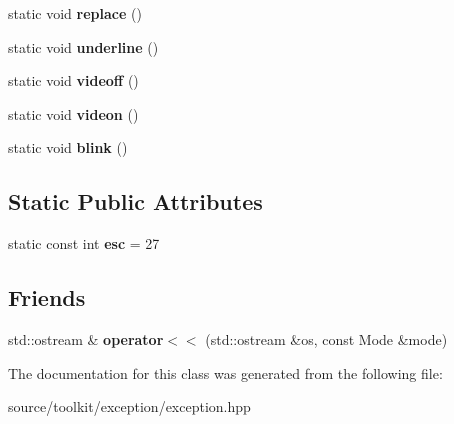 \begin{DoxyCompactItemize}
static void {\bfseries replace} ()
\item 
\mbox{\label{classConsole_acdbffad9e6d5faf3654f2f662a885c05}} 
static void {\bfseries underline} ()
\item 
\mbox{\label{classConsole_a0c0b82ca8465e8d07d1c1000fd1c7065}} 
static void {\bfseries videoff} ()
\item 
\mbox{\label{classConsole_a9452e745b8255bfc5c01914e284a6dde}} 
static void {\bfseries videon} ()
\item 
\mbox{\label{classConsole_a0d4128ee5041ea69f58cbb0d200a2f80}} 
static void {\bfseries blink} ()
\end{DoxyCompactItemize}
\subsection*{Static Public Attributes}
\begin{DoxyCompactItemize}
\item 
\mbox{\label{classConsole_abf80bf3470dade29c45fed14ee6e9d38}} 
static const int {\bfseries esc} = 27
\end{DoxyCompactItemize}
\subsection*{Friends}
\begin{DoxyCompactItemize}
\item 
\mbox{\label{classConsole_aff1b0921f7ab18e456bfb58711afdaea}} 
std\+::ostream \& {\bfseries operator$<$$<$} (std\+::ostream \&os, const Mode \&mode)
\end{DoxyCompactItemize}


The documentation for this class was generated from the following file\+:\begin{DoxyCompactItemize}
\item 
source/toolkit/exception/exception.\+hpp\end{DoxyCompactItemize}
